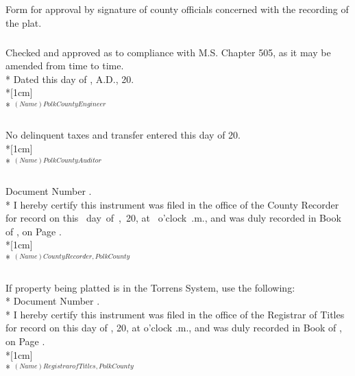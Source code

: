 \subsection{}
Form for approval by signature of county officials concerned with the recording of the plat.
\subsubsection{}
Checked and approved as to compliance with M.S. Chapter 505, as it may be amended from time to time.\\*
Dated this \fillable{1cm} day of \fillable{2cm}, A.D.,  20\fillable{1cm}.\\*[1cm]
\fillable{5cm}\\*
$^{(Name) Polk County Engineer}$
\subsubsection{}
No delinquent taxes and transfer entered this \fillable{1cm} day of \fillable{2cm} 20\fillable{1cm}.\\*[1cm]
\fillable{5cm}\\*
$^{(Name) Polk County Auditor}$
\subsubsection{}
Document Number \fillable{2cm}.\\*
I hereby certify this instrument was filed in the office of the County Recorder for record on this \mbox{\fillable{1cm} day of \fillable{2cm},  20\fillable{1cm},} at \mbox{\fillable{1cm} o’clock \fillable{1cm}.m.,} and was duly recorded in Book \fillable{2cm} of \fillable{2cm}, on Page \fillable{1cm}.\\*[1cm]
\fillable{5cm}\\*
$^{(Name) County Recorder, Polk County}$
\subsubsection{}
If property being platted is in the Torrens System, use the following:\\*
Document Number \fillable{2cm}.\\*
I hereby certify this instrument was filed in the office of the Registrar of Titles for record on this \fillable{1cm} day of \fillable{2cm}, 20\fillable{1cm}, at \fillable{1cm} o’clock \fillable{1cm}.m., and was duly recorded in Book \fillable{2cm} of \fillable{2cm}, on Page \fillable{1cm}.\\*[1cm]
\fillable{5cm}\\*
$^{(Name) Registrar of Titles, Polk County}$

